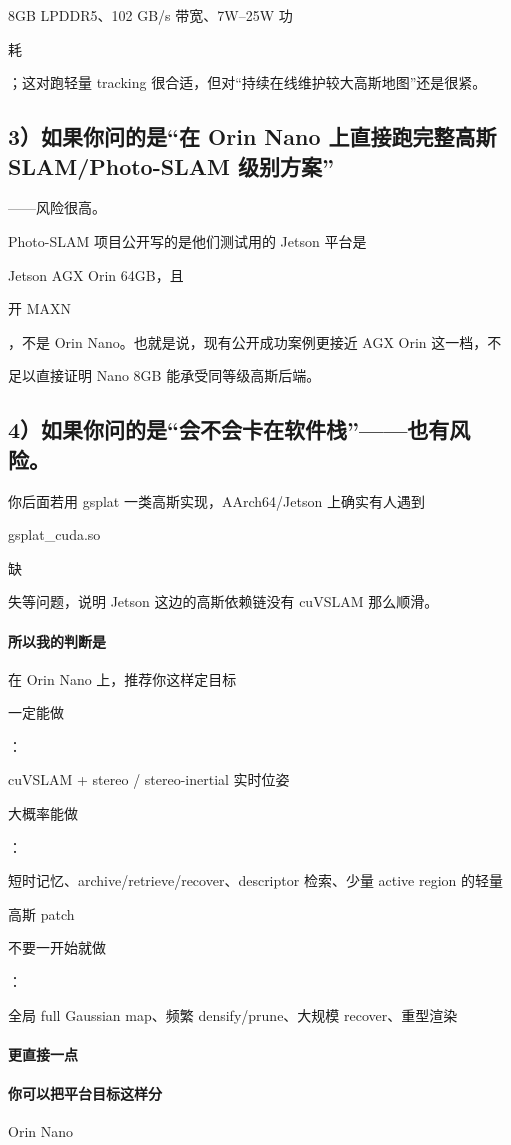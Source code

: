 \documentclass[12pt]{article}
\begin{document}
8GB LPDDR5、102 GB/s 带宽、7W–25W 功

耗

；这对跑轻量 tracking 很合适，但对“持续在线维护较大高斯地图”还是很紧。

\subsection{3）如果你问的是“在 Orin Nano 上直接跑完整高斯 SLAM/Photo-SLAM 级别方案”}
——风险很高。

Photo-SLAM 项目公开写的是他们测试用的 Jetson 平台是

Jetson AGX Orin 64GB，且

开 MAXN

，不是 Orin Nano。也就是说，现有公开成功案例更接近 AGX Orin 这一档，不

足以直接证明 Nano 8GB 能承受同等级高斯后端。

\subsection{4）如果你问的是“会不会卡在软件栈”——也有风险。}
你后面若用 gsplat 一类高斯实现，AArch64/Jetson 上确实有人遇到

gsplat\_cuda.so

缺

失等问题，说明 Jetson 这边的高斯依赖链没有 cuVSLAM 那么顺滑。

\paragraph{所以我的判断是}
在 Orin Nano 上，推荐你这样定目标

一定能做

：

cuVSLAM + stereo / stereo-inertial 实时位姿

大概率能做

：

短时记忆、archive/retrieve/recover、descriptor 检索、少量 active region 的轻量

高斯 patch

不要一开始就做

：

全局 full Gaussian map、频繁 densify/prune、大规模 recover、重型渲染

\paragraph{更直接一点}
\paragraph{你可以把平台目标这样分}
Orin Nano
\end{document}
